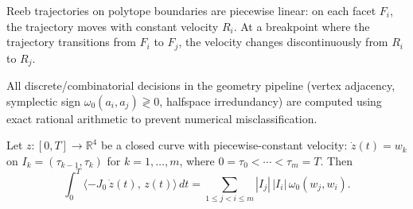 \begin{unverified}
\begin{lemma}\label{lem:piecewise-linear-reeb}
Reeb trajectories on polytope boundaries are piecewise linear:
on each facet $F_i$, the trajectory moves with constant velocity $R_i$.
At a breakpoint where the trajectory transitions from $F_i$ to $F_j$,
the velocity changes discontinuously from $R_i$ to $R_j$.
\end{lemma}
\end{unverified}



\begin{unverified}
\begin{lemma}\label{lem:rational-pipeline}
All discrete/combinatorial decisions in the geometry pipeline
(vertex adjacency, symplectic sign $\omega_0(a_i, a_j) \gtrless 0$,
halfspace irredundancy) are computed using exact rational arithmetic
to prevent numerical misclassification.
\end{lemma}
\end{unverified}



\begin{lemma}\label{lem:shoelace}
Let $z \colon [0, T] \to \mathbb{R}^4$ be a closed curve with
piecewise-constant velocity:
$\dot{z}(t) = w_k$ on $I_k = (\tau_{k-1}, \tau_k)$ for
$k = 1, \ldots, m$, where $0 = \tau_0 < \cdots < \tau_m = T$.
Then
\[
  \int_0^T \langle -J_0\, \dot{z}(t),\, z(t) \rangle \, dt
  = \sum_{1 \leq j < i \leq m}
    |I_j|\, |I_i|\, \omega_0(w_j, w_i).
\]
\end{lemma}

